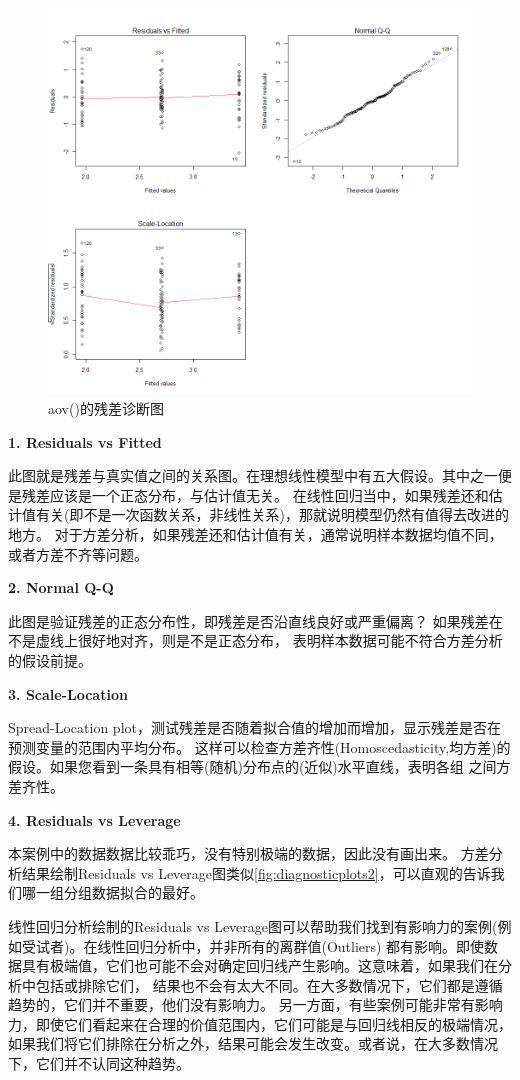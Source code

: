 \documentclass[
]{article}
\begin{document}
\begin{figure}

{\centering \includegraphics[width=0.6\linewidth]{image/diagnosticplots} 

}

\caption{aov()的残差诊断图}\label{fig:diagnosticplots1}
\end{figure}

\textbf{1. Residuals vs Fitted}

此图就是残差与真实值之间的关系图。在理想线性模型中有五大假设。其中之一便是残差应该是一个正态分布，与估计值无关。
在线性回归当中，如果残差还和估计值有关(即不是一次函数关系，非线性关系)，那就说明模型仍然有值得去改进的地方。
对于方差分析，如果残差还和估计值有关，通常说明样本数据均值不同，或者方差不齐等问题。

\textbf{2. Normal Q-Q}

此图是验证残差的正态分布性，即残差是否沿直线良好或严重偏离？ 如果残差在不是虚线上很好地对齐，则是不是正态分布，
表明样本数据可能不符合方差分析的假设前提。

\textbf{3. Scale-Location}

Spread-Location plot，测试残差是否随着拟合值的增加而增加，显示残差是否在预测变量的范围内平均分布。
这样可以检查方差齐性(Homoscedasticity,均方差)的假设。如果您看到一条具有相等(随机)分布点的(近似)水平直线，表明各组
之间方差齐性。

\textbf{4. Residuals vs Leverage}

本案例中的数据数据比较乖巧，没有特别极端的数据，因此没有画出来。
方差分析结果绘制Residuals vs Leverage图类似\ref{fig:diagnosticplots2}，可以直观的告诉我们哪一组分组数据拟合的最好。

线性回归分析绘制的Residuals vs Leverage图可以帮助我们找到有影响力的案例(例如受试者)。在线性回归分析中，并非所有的离群值(Outliers)
都有影响。即使数据具有极端值，它们也可能不会对确定回归线产生影响。这意味着，如果我们在分析中包括或排除它们，
结果也不会有太大不同。在大多数情况下，它们都是遵循趋势的，它们并不重要，他们没有影响力。
另一方面，有些案例可能非常有影响力，即使它们看起来在合理的价值范围内，它们可能是与回归线相反的极端情况，
如果我们将它们排除在分析之外，结果可能会发生改变。或者说，在大多数情况下，它们并不认同这种趋势。
\end{document}
